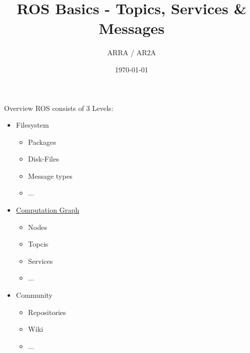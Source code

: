 \documentclass{beamer}
\title[]{ROS Basics - Topics, Services \& Messages} %
\author{ARRA / AR2A} %
\institute %
{
Advancements for Robotics in Rescue Applications
}
\date{\today} %
\begin{document}
\begin{frame}
\titlepage %
\end{frame}
\begin{frame}{Overview}
	ROS consists of 3 Levels:
	\begin{itemize}
		\item Filesystem
			\begin{itemize}
				\item Packages
				\item Disk-Files
				\item Message types
				\item ...
			\end{itemize}
		\item \underline{Computation Graph}
			\begin{itemize}
				\item Nodes
				\item Topcis
				\item Services
				\item ...
			\end{itemize}
		\item Community
			\begin{itemize}
				\item Repositories
				\item Wiki
				\item ...
			\end{itemize}
	\end{itemize}
\end{frame}
\end{document}
